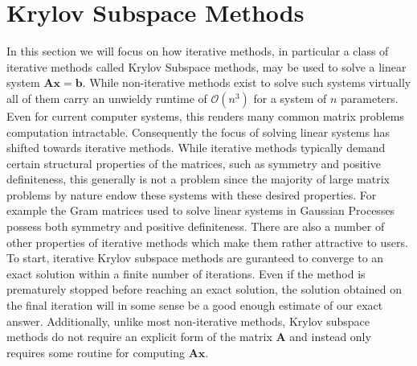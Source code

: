 \section{Krylov Subspace Methods}\label{Chapter4}
In this section we will focus on how iterative methods, in particular a class of iterative methods called Krylov Subspace methods, may be used to solve a linear system $\bm{A} \bm{x} = \bm{b}$. While non-iterative methods exist to solve such systems virtually all of them carry an unwieldy runtime of $\mathcal{O} \left( n^3 \right)$ for a system of $n$ parameters. Even for current computer systems, this renders many common matrix problems computation intractable. Consequently the focus of solving linear systems has shifted towards iterative methods. While iterative methods typically demand certain structural properties of the matrices, such as symmetry and positive definiteness, this generally is not a problem since the majority of large matrix problems by nature endow these systems with these desired properties. For example the Gram matrices used to solve linear systems in Gaussian Processes possess both symmetry and positive definiteness. There are also a number of other properties of iterative methods which make them rather attractive to users. To start, iterative Krylov subspace methods are guranteed to converge to an exact solution within a finite number of iterations. Even if the method is prematurely stopped before reaching an exact solution, the solution obtained on the final iteration will in some sense be a good enough estimate of our exact answer. Additionally, unlike most non-iterative methods, Krylov subspace methods do not require an explicit form of the matrix $\bm{A}$ and instead only requires some routine for computing $\bm{A} \bm{x}$.











